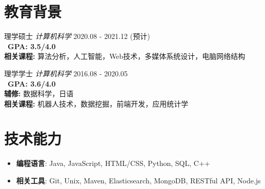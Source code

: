 \documentclass{resume}
\begin{document}



\vspace{-6pt}

\section{教育背景}
{理学硕士 \textit{计算机科学} \hfill 2020.08 - 2021.12 (预计)}\\
\ \textbf{GPA: 3.5/4.0} \\
{\footnotesize \textbf{相关课程: }算法分析，人工智能，Web技术，多媒体系统设计，电脑网络结构}

{理学学士 \textit{计算机科学} \hfill 2016.08 - 2020.05}\\
\ \textbf{GPA: 3.6/4.0} \\
{\footnotesize \textbf{辅修: }数据科学，日语} \\
{\footnotesize \textbf{相关课程: }机器人技术，数据挖掘，前端开发，应用统计学}
\vspace{-3pt}

\section{技术能力}
\begin{itemize}[parsep=0.2ex]
  \item \textbf{编程语言}: Java, JavaScript, HTML/CSS, Python, SQL, C++
  \item \textbf{相关工具}: Git, Unix, Maven, Elasticsearch, MongoDB, RESTful API, Node.js 
\end{itemize}
\end{document}
